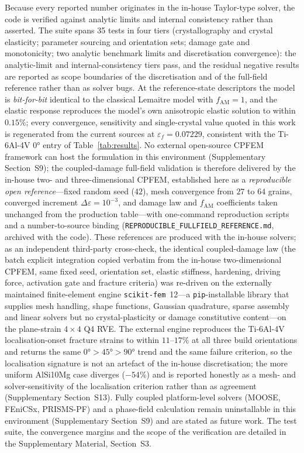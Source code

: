 \documentclass[12pt,a4paper,twocolumn]{article}
\begin{document}
Because every reported number originates in the in-house Taylor-type solver, the code is verified against analytic limits and internal consistency rather than asserted. The suite spans 35 tests in four tiers (crystallography and crystal elasticity; parameter sourcing and orientation sets; damage gate and monotonicity; two analytic benchmark limits and discretisation convergence): the analytic-limit and internal-consistency tiers pass, and the residual negative results are reported as scope boundaries of the discretisation and of the full-field reference rather than as solver bugs. At the reference-state descriptors the model is \emph{bit-for-bit} identical to the classical Lemaitre model with $f_{\mathrm{AM}} = 1$, and the elastic response reproduces the model's own anisotropic elastic solution to within $0.15\%$; every convergence, sensitivity and single-crystal value quoted in this work is regenerated from the current sources at $\varepsilon_f = 0.07229$, consistent with the Ti-6Al-4V $\ang{0}$ entry of Table~\ref{tab:results}. No external open-source CPFEM framework can host the formulation in this environment (Supplementary Section~S9); the coupled-damage full-field validation is therefore delivered by the in-house two- and three-dimensional CPFEM, established here as a \emph{reproducible open reference}---fixed random seed ($42$), mesh convergence from $27$ to $64$ grains, converged increment $\Delta\varepsilon = 10^{-3}$, and damage law and $f_{\mathrm{AM}}$ coefficients taken unchanged from the production table---with one-command reproduction scripts and a number-to-source binding (\texttt{REPRODUCIBLE\_FULLFIELD\_REFERENCE.md}, archived with the code). These references are produced with the in-house solvers; as an independent third-party cross-check, the identical coupled-damage law (the batch explicit integration copied verbatim from the in-house two-dimensional CPFEM, same fixed seed, orientation set, elastic stiffness, hardening, driving force, activation gate and fracture criteria) was re-driven on the externally maintained finite-element engine \texttt{scikit-fem}~12---a \texttt{pip}-installable library that supplies mesh handling, shape functions, Gaussian quadrature, sparse assembly and linear solvers but no crystal-plasticity or damage constitutive content---on the plane-strain $4\times4$ Q4 RVE. The external engine reproduces the Ti-6Al-4V localisation-onset fracture strains to within $11$--$17\%$ at all three build orientations and returns the same $\ang{0}>\ang{45}>\ang{90}$ trend and the same failure criterion, so the localisation signature is not an artefact of the in-house discretisation; the more uniform AlSi10Mg case diverges ($-54\%$) and is reported honestly as a mesh- and solver-sensitivity of the localisation criterion rather than as agreement (Supplementary Section~S13). Fully coupled platform-level solvers (MOOSE, FEniCSx, PRISMS-PF) and a phase-field calculation remain uninstallable in this environment (Supplementary Section~S9) and are stated as future work. The test suite, the convergence margins and the scope of the verification are detailed in the Supplementary Material, Section~S3.
\end{document}
